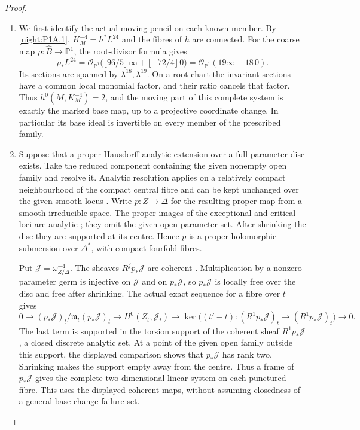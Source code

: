 \documentclass[11pt,a4paper]{article}
\theoremstyle{definition}
\begin{document}
\begin{proof}
\begin{enumerate}[label=\arabic*.]
\item We first identify the actual moving pencil on each known member.
By \cref{night:P1A.1}, $K_M^{-4}=h^*L^{24}$ and the fibres of $h$
are connected.  For the coarse map
$\rho:\widehat B\to\mathbb P^1$, the root-divisor formula gives
\[
 \rho_*L^{24}
 =\mathcal O_{\mathbb P^1}
   \bigl(\lfloor96/5\rfloor\,\infty+
                \lfloor-72/4\rfloor\,0\bigr)
 =\mathcal O_{\mathbb P^1}(19\infty-18\,0).
\]
Its sections are spanned by $\lambda^{18},\lambda^{19}$.
On a root chart the invariant sections have a common local
monomial factor, and their ratio cancels that factor.  Thus
$h^0(M,K_M^{-4})=2$, and the moving part of this complete
system is exactly the marked base map, up to a projective
coordinate change.  In particular its base ideal is invertible
on every member of the prescribed family.

\item Suppose that a proper Hausdorff analytic extension over a full
parameter disc exists.  Take the reduced component containing
the given nonempty open family and resolve it.  Analytic
resolution applies on a relatively compact neighbourhood of
the compact central fibre and can be kept unchanged over the
given smooth locus
\cite[Theorem 1.6 and its following analytic-neighbourhood
paragraph, preprint p.~5]{BM97}.
Write $p:Z\to\Delta$ for the resulting proper map from a smooth
irreducible space.  The proper images of the exceptional and
critical loci are analytic
\cite[\S7, Satz 1, p.~60]{Grauert60}; they omit the given open
parameter set.  After shrinking the disc they are supported
at its centre.  Hence $p$ is a proper holomorphic submersion
over $\Delta^*$, with compact fourfold fibres.

Put $\mathcal J=\omega_{Z/\Delta}^{-4}$.
The sheaves $R^jp_*\mathcal J$ are coherent
\cite[\S6, Hauptsatz I, p.~59]{Grauert60}.
Multiplication by a nonzero parameter germ is injective on
$\mathcal J$ and on $p_*\mathcal J$, so $p_*\mathcal J$ is locally free
over the disc and free after shrinking.
The actual exact sequence for a fibre over $t$ gives
\[
 0\longrightarrow(p_*\mathcal J)_t/\mathfrak m_t(p_*\mathcal J)_t
 \longrightarrow H^0(Z_t,\mathcal J_t)
 \longrightarrow
 \ker\bigl((t'-t): (R^1p_*\mathcal J)_t
                       \longrightarrow(R^1p_*\mathcal J)_t\bigr)
 \longrightarrow0.
\]
The last term is supported in the torsion support of the
coherent sheaf $R^1p_*\mathcal J$, a closed discrete analytic
set.  At a point of the given open family outside this support,
the displayed comparison shows that $p_*\mathcal J$ has rank
two.  Shrinking makes the support empty away from the centre.
Thus a frame of $p_*\mathcal J$ gives the complete two-dimensional
linear system on each punctured fibre.  This uses the displayed
coherent maps, without assuming closedness of a general
base-change failure set.


\end{enumerate}
\end{proof}
\end{document}
